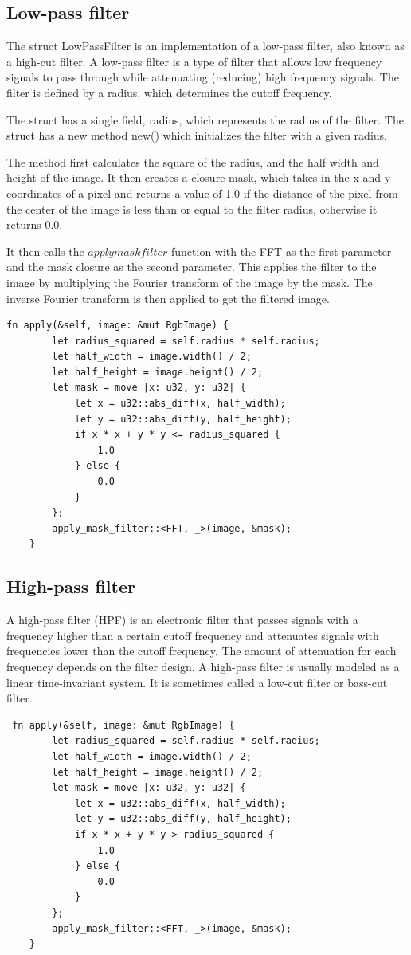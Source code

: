 \documentclass[12pt]{article}
\begin{document}
\subsection{Low-pass filter}
The struct LowPassFilter is an implementation of a low-pass filter, also known as a high-cut filter. A low-pass filter is a type of filter that allows low frequency signals to pass through while attenuating (reducing) high frequency signals. The filter is defined by a radius, which determines the cutoff frequency.

The struct has a single field, radius, which represents the radius of the filter. The struct has a new method new() which initializes the filter with a given radius.

The method first calculates the square of the radius, and the half width and height of the image. It then creates a closure mask, which takes in the x and y coordinates of a pixel and returns a value of 1.0 if the distance of the pixel from the center of the image is less than or equal to the filter radius, otherwise it returns 0.0.

It then calls the $apply mask filter$ function with the FFT as the first parameter and the mask closure as the second parameter. This applies the filter to the image by multiplying the Fourier transform of the image by the mask. The inverse Fourier transform is then applied to get the filtered image.

\begin{lstlisting}
fn apply(&self, image: &mut RgbImage) {
        let radius_squared = self.radius * self.radius;
        let half_width = image.width() / 2;
        let half_height = image.height() / 2;
        let mask = move |x: u32, y: u32| {
            let x = u32::abs_diff(x, half_width);
            let y = u32::abs_diff(y, half_height);
            if x * x + y * y <= radius_squared {
                1.0
            } else {
                0.0
            }
        };
        apply_mask_filter::<FFT, _>(image, &mask);
    }
\end{lstlisting}
\subsection{High-pass filter}
A high-pass filter (HPF) is an electronic filter that passes signals with a frequency higher than a certain cutoff frequency and attenuates signals with frequencies lower than the cutoff frequency. The amount of attenuation for each frequency depends on the filter design. A high-pass filter is usually modeled as a linear time-invariant system. It is sometimes called a low-cut filter or bass-cut filter.
\begin{lstlisting}
 fn apply(&self, image: &mut RgbImage) {
        let radius_squared = self.radius * self.radius;
        let half_width = image.width() / 2;
        let half_height = image.height() / 2;
        let mask = move |x: u32, y: u32| {
            let x = u32::abs_diff(x, half_width);
            let y = u32::abs_diff(y, half_height);
            if x * x + y * y > radius_squared {
                1.0
            } else {
                0.0
            }
        };
        apply_mask_filter::<FFT, _>(image, &mask);
    }
\end{lstlisting}
\end{document}
